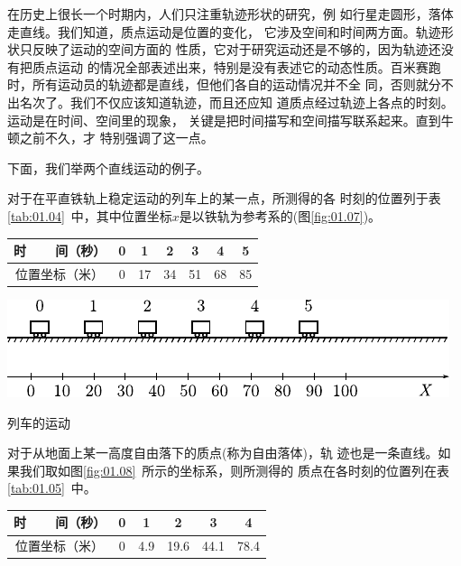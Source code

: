 在历史上很长一个时期内，人们只注重轨迹形状的研究，例
如行星走圆形，落体走直线。我们知道，质点运动是位置的变化，
它涉及空间和时间两方面。轨迹形状只反映了运动的空间方面的
性质，它对于研究运动还是不够的，因为轨迹还没有把质点运动
的情况全部表述出来，特别是没有表述它的动态性质。百米赛跑
时，所有运动员的轨迹都是直线，但他们各自的运动情况并不全
同，否则就分不出名次了。我们不仅应该知道轨迹，而且还应知
道质点经过轨迹上各点的时刻。运动是在时间、空间里的现象，
关键是把时间描写和空间描写联系起来。直到牛顿之前不久，才
特别强调了这一点。

下面，我们举两个直线运动的例子。

对于在平直铁轨上稳定运动的列车上的某一点，所测得的各
时刻的位置列于表\ref{tab:01.04}~中，其中位置坐标$x$是以铁轨为参考系的(图\ref{fig:01.07})。
\vspace{-1em}
\begin{tablex}[!h]{1.1em}
    \caption{}
    \label{tab:01.04}
    \centering
        \begin{tabular}{c|c|c|c|c|c|c}
            \toprule
            时~~~~间（秒） & 0 & 1  & 2  & 3  & 4  & 5  \\
            \midrule
            位置坐标（米） & 0 & 17 & 34 & 51 & 68 & 85 \\
            \bottomrule
        \end{tabular}
\end{tablex}

\begin{figurex}[!h]
    \centering
    \includegraphics{figure/fig01.07}
    \caption{列车的运动}
    \label{fig:01.07}
\end{figurex}

对于从地面上某一高度自由落下的质点(称为自由落体)，轨
迹也是一条直线。如果我们取如图\ref{fig:01.08}~所示的坐标系，则所测得的
质点在各时刻的位置列在表\ref{tab:01.05}~中。
\begin{tablex}[!h]{1.15em}
    \caption{}
    \label{tab:01.05}
    \centering
        \begin{tabular}{c|c|c|c|c|c}
            \toprule
            时~~~~间（秒） & 0 & 1   & 2    & 3    & 4    \\
            \midrule
            位置坐标（米） & 0 & 4.9 & 19.6 & 44.1 & 78.4 \\
            \bottomrule
        \end{tabular}
\end{tablex}

